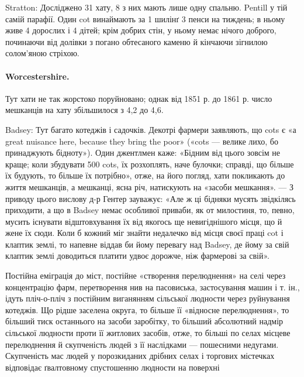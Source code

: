 Stratton: Досліджено 31 хату, 8 з них мають лише одну
спальню. Pentill у тій самій парафії. Один cot винаймають за
1 шилінґ 3 пенси на тиждень; в ньому живе 4 дорослих і 4 дітей;
крім добрих стін, у ньому немає нічого доброго, починаючи від
долівки з погано обтесаного каменю й кінчаючи зігнилою солом’яною
стріхою.

\paragraph{Worcestershire.}

Тут хати не так жорстоко поруйновано; однак від 1851 р. до
1861 р. число мешканців на хату збільшилося з 4,2 до 4,6.

Badsey: Тут багато котеджів і садочків. Декотрі фармери
заявляють, що cots є «а great nuisance here, because they bring
the poor» («cots — велике лихо, бо принаджують бідноту»).
Один джентлмен каже: «Бідним від цього зовсім не краще; коли
збудувати 500 cots, їх розхоплять, наче булочки; справді, що
більше їх будують, то більше їх потрібно», отже, на його погляд,
хати покликають до життя мешканців, а мешканці, ясна річ,
натискують на «засоби мешкання». — З приводу цього вислову
д-р Гентер зауважує: «Але ж ці бідняки мусять звідкілясь
приходити, а що в Badsey немає особливої приваби, як от милостиня,
то, певно, мусить існувати відштовхування їх від якогось
ще невигіднішого місця, що й жене їх сюди. Коли б кожний міг
знайти недалечко від місця своєї праці cot і клаптик землі, то
напевне віддав би йому перевагу над Badsey, де йому за свій
клаптик землі доводиться платити удвоє дорожче, ніж фармерові
за свій».

Постійна еміграція до міст, постійне «створення перелюднення»
на селі через концентрацію фарм, перетворення нив на пасовиська,
застосування машин і т. ін., ідуть пліч-о-пліч з постійним
виганянням сільської людности через руйнування котеджів.
Що рідше заселена округа, то більше її «відносне перелюднення»,
то більший тиск останнього на засоби заробітку, то більший
абсолютний надмір сільської людности проти її житлових
засобів, отже, то більші по селах місцеве перелюднення й скупченість
людей з її наслідками — пошесними недугами. Скупченість
мас людей у порозкиданих дрібних селах і торгових містечках
відповідає ґвалтовному спустошенню людности на поверхні
\parbreak{}  %
